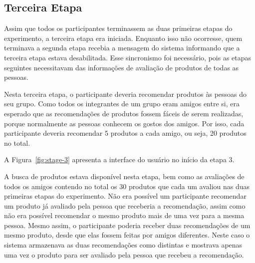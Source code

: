 \subsection{Terceira Etapa}

Assim que todos os participantes terminassem as duas primeiras etapas do experimento, a terceira etapa era iniciada. Enquanto isso não ocorresse, quem terminava a segunda etapa recebia a mensagem do sistema informando que a terceira etapa estava desabilitada. Esse sincronismo foi necessário, pois as etapas seguintes necessitavam das informações de avaliação de produtos de todas as pessoas.

Nesta terceira etapa, o participante deveria recomendar produtos às pessoas do seu grupo. Como todos os integrantes de um grupo eram amigos entre si, era esperado que as recomendações de produtos fossem fáceis de serem realizadas, porque normalmente as pessoas conhecem os gostos dos amigos. Por isso, cada participante deveria recomendar 5 produtos a cada amigo, ou seja, 20 produtos no total.

A Figura~\ref{fig:stage-3} apresenta a interface do usuário no início da etapa 3.

A busca de produtos estava disponível nesta etapa, bem como as avaliações de todos os amigos contendo no total os 30 produtos que cada um avaliou nas duas primeiras etapas do experimento. Não era possível um participante recomendar um produto já avaliado pela pessoa que receberia a recomendação, assim como não era possível recomendar o mesmo produto mais de uma vez para a mesma pessoa. Mesmo assim, o participante poderia receber duas recomendações de um mesmo produto, desde que elas fossem feitas por amigos diferentes. Neste caso o sistema armazenava as duas recomendações como distintas e mostrava apenas uma vez o produto para ser avaliado pela pessoa que recebeu a recomendação.

